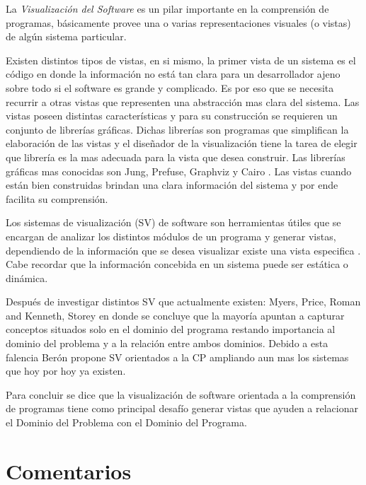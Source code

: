 \documentclass[a4paper,12pt]{report}
\begin{document}
La \textit{Visualización del Software} es un pilar importante en la comprensión de programas, básicamente provee una o varias representaciones visuales (o vistas) de algún sistema particular. 

Existen distintos tipos de vistas, en si mismo, la primer vista de un sistema es el código en donde la información no está tan clara para un desarrollador ajeno sobre todo si el software es grande y complicado. Es por eso que se necesita recurrir a otras vistas que representen una abstracción mas clara del sistema.
Las vistas poseen distintas características y para su construcción se requieren un conjunto de librerías gráficas. Dichas librerías son programas que simplifican la elaboración de las vistas y el diseñador de la visualización tiene la tarea de elegir que librería es la mas adecuada para la vista que desea construir. Las librerías gráficas mas conocidas son Jung, Prefuse, Graphviz y Cairo \cite{BRM10}. Las vistas cuando están bien construidas brindan una clara información del sistema y por ende facilita su comprensión. 

Los sistemas de visualización (SV) de software son herramientas útiles que se encargan de analizar los distintos módulos de un programa y generar vistas, dependiendo de la información que se desea visualizar existe una vista especifica \cite{MPMR07}. Cabe recordar que la información concebida en un sistema puede ser estática o dinámica.

Después de investigar distintos SV que actualmente existen: Myers, Price, Roman and Kenneth, Storey \cite{MBPHRU10}
en donde se concluye que la mayoría apuntan a capturar conceptos situados solo en el dominio del programa restando importancia al dominio del problema y a la relación entre ambos dominios. Debido a esta falencia Berón \cite{MBPHRU10} propone SV orientados a la CP ampliando aun mas los sistemas que hoy por hoy ya existen.

Para concluir se dice que la visualización de software orientada a la comprensión de programas tiene como principal desafío generar vistas que ayuden a relacionar el Dominio del Problema con el Dominio del Programa. 

\section{Comentarios}
\end{document}
